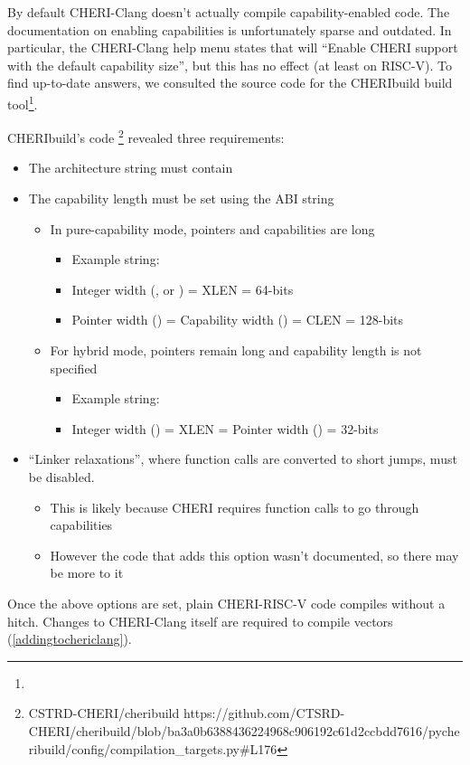 By default CHERI-Clang doesn't actually compile capability-enabled code.
The documentation on enabling capabilities is unfortunately sparse and outdated.
In particular, the CHERI-Clang help menu states that  will \enquote{Enable CHERI support with the default capability size}, but this has no effect (at least on RISC-V).
To find up-to-date answers, we consulted the source code for the CHERIbuild build tool\footnote{}.

CHERIbuild's code%
\footnote{%
%
    {CSTRD-CHERI/cheribuild}%
    {https://github.com/CTSRD-CHERI/cheribuild/blob/ba3a0b6388436224968c906192c61d2ccbdd7616/pycheribuild/config/compilation_targets.py\#L176}%
} revealed three requirements:
\begin{itemize}
    \item The architecture string must contain 
    \item The capability length must be set using the ABI string
    \begin{itemize}
        \item In pure-capability mode, pointers and capabilities are  long
        \begin{itemize}
            \item Example string: 
            \item Integer width (, or ) = XLEN = 64-bits
            \item Pointer width () = Capability width () = CLEN = 128-bits
        \end{itemize}
        \item For hybrid mode, pointers remain  long and capability length is not specified
        \begin{itemize}
            \item Example string: 
            \item Integer width () = XLEN = Pointer width () = 32-bits
        \end{itemize}
    \end{itemize}
    \item ``Linker relaxations'', where function calls are converted to short jumps\cite{chenCompilerSupportLinker2019}, must be disabled.
    \begin{itemize}
        \item This is likely because CHERI requires function calls to go through capabilities
        \item However the code that adds this option wasn't documented, so there may be more to it
    \end{itemize}
\end{itemize}

Once the above options are set, plain CHERI-RISC-V code compiles without a hitch.
Changes to CHERI-Clang itself are required to compile vectors (\cref{addingtochericlang}).